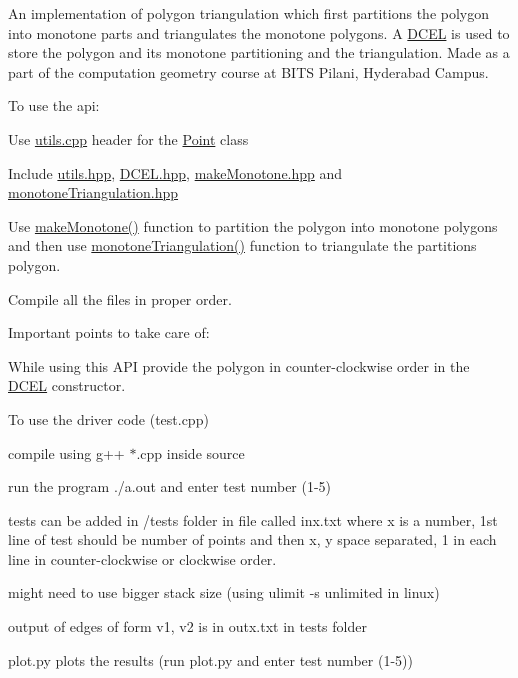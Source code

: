 \label{index_md_src_Readme}%
%
 An implementation of polygon triangulation which first partitions the polygon into monotone parts and triangulates the monotone polygons. A \mbox{\hyperlink{class_d_c_e_l}{D\+C\+EL}} is used to store the polygon and its monotone partitioning and the triangulation. Made as a part of the computation geometry course at B\+I\+TS Pilani, Hyderabad Campus.

To use the api\+:


\begin{DoxyItemize}
\item Use \mbox{\hyperlink{utils_8cpp}{utils.\+cpp}} header for the \mbox{\hyperlink{class_point}{Point}} class
\item Include \mbox{\hyperlink{utils_8hpp}{utils.\+hpp}}, \mbox{\hyperlink{_d_c_e_l_8hpp}{D\+C\+E\+L.\+hpp}}, \mbox{\hyperlink{make_monotone_8hpp}{make\+Monotone.\+hpp}} and \mbox{\hyperlink{monotone_triangulation_8hpp}{monotone\+Triangulation.\+hpp}}
\item Use \mbox{\hyperlink{make_monotone_8cpp_a31a4c0ba0613e4dee1f5892f6ea2c365}{make\+Monotone()}} function to partition the polygon into monotone polygons and then use \mbox{\hyperlink{monotone_triangulation_8cpp_a99e8ed0941479757edfb577ebe8d1061}{monotone\+Triangulation()}} function to triangulate the partitions polygon.
\item Compile all the files in proper order.
\end{DoxyItemize}

Important points to take care of\+:


\begin{DoxyItemize}
\item While using this A\+PI provide the polygon in counter-\/clockwise order in the \mbox{\hyperlink{class_d_c_e_l}{D\+C\+EL}} constructor.
\end{DoxyItemize}

To use the driver code (test.\+cpp)


\begin{DoxyItemize}
\item compile using g++ $\ast$.cpp inside source
\item run the program ./a.out and enter test number (1-\/5)
\item tests can be added in /tests folder in file called inx.\+txt where x is a number, 1st line of test should be number of points and then x, y space separated, 1 in each line in counter-\/clockwise or clockwise order.
\item might need to use bigger stack size (using ulimit -\/s unlimited in linux)
\item output of edges of form v1, v2 is in outx.\+txt in tests folder
\item plot.\+py plots the results (run plot.\+py and enter test number (1-\/5)) 
\end{DoxyItemize}
